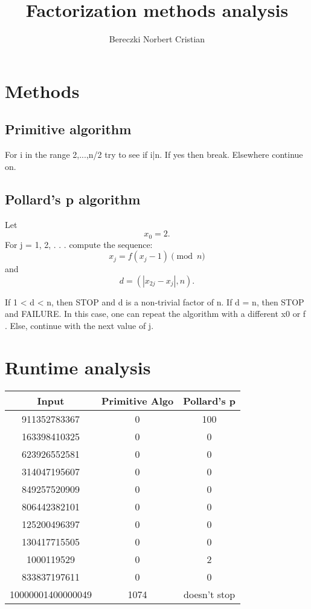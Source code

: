 \documentclass{article}
\begin{document}



\title{Factorization methods analysis}
\author{Bereczki Norbert Cristian}
\maketitle

\section{Methods}
\subsection{Primitive algorithm}
For i in the range {2,...,n/2} try to see if i|n. If yes then break. Elsewhere continue on. 
\subsection{Pollard's p algorithm}
Let \[x_0 = 2 .\]
For j = 1, 2, . . . compute the sequence:
\[x_j = f (x_j - 1)\pmod{n} \]
and \[d = (|x_{2j} - x_j|, n).\]

If 1 < d < n, then STOP and d is a non-trivial factor of n.
If d = n, then STOP and FAILURE. In this case, one can
repeat the algorithm with a different x0 or f .
Else, continue with the next value of j.

\section{Runtime analysis}
\begin{center}
 \begin{tabular}{||c c c||} 
 \hline
 Input & Primitive Algo & Pollard's p \\ [0.5ex] 
 \hline\hline
 911352783367 & 0 & 100 \\ 
 \hline
 163398410325 & 0 & 0 \\
 \hline
 623926552581 & 0 & 0 \\
 \hline
 314047195607 & 0 & 0 \\
 \hline
 849257520909 & 0 & 0 \\ [1ex] 
 \hline
 806442382101 & 0 & 0 \\ [1ex] 
 \hline
 125200496397 & 0 & 0 \\ [1ex] 
 \hline
 130417715505 & 0 & 0 \\ [1ex] 
 \hline
 1000119529 & 0 & 2 \\ [1ex] 
 \hline
 833837197611 & 0 & 0 \\ [1ex] 
 \hline
 10000001400000049 & 1074 & doesn't stop \\ [1ex] 
 \hline
\end{tabular}
\end{center}
\end{document}
